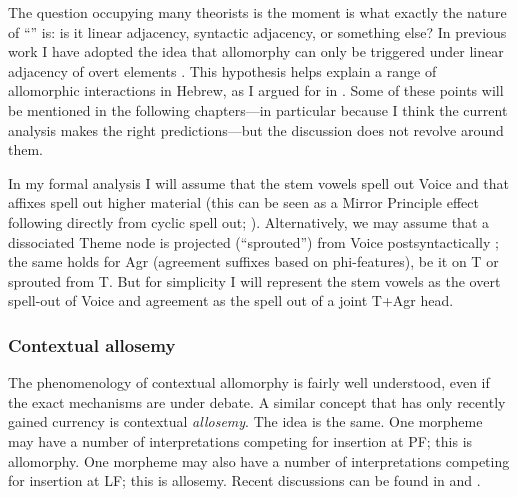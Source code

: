 \begin{exe}
\begin{xlist}
\begin{exe}
\begin{exe}
\begin{exe}
\begin{exe}
\begin{xlist}
\begin{exe}
\begin{xlist}
\begin{xlist}
\begin{xlist}
\begin{exe}
\begin{xlist}
\begin{exe}
\begin{exe}
\begin{exe}
\begin{exe}
\begin{xlist}
\begin{exe}
\begin{xlist}
\begin{exe}
\begin{exe}
\begin{xlist}
\begin{exe}
\begin{xlist}
\begin{exe}
\begin{xlist}
\begin{exe}
\begin{exe}
\begin{xlist}
\begin{exe}
\begin{exe}
\begin{xlist}
\begin{exe}
\begin{exe}
\begin{xlist}
\begin{exe}
The question occupying many theorists is the moment is what exactly the nature of ``\trace'' is: is it linear adjacency, syntactic adjacency, or something else? In previous work I have adopted the idea that allomorphy can only be triggered under linear adjacency of overt elements \citep{embick10,marantz13}. This hypothesis helps explain a range of allomorphic interactions in Hebrew, as I argued for in \cite{kastner18nllt}. Some of these points will be mentioned in the following chapters---in particular because I think the current analysis makes the right predictions---but the discussion does not revolve around them.

In my formal analysis I will assume that the stem vowels spell out Voice and that affixes spell out higher material (this can be seen as a Mirror Principle effect following directly from cyclic spell out; \citealt{baker85,muysken88,katie13,zukoff16nels,kastner18nllt}). Alternatively, we may assume that a dissociated Theme node is projected (``sprouted'') from Voice postsyntactically \citep{oltramassuet99,embick10}; the same holds for Agr (agreement suffixes based on phi-features), be it on T or sprouted from T. But for simplicity I will represent the stem vowels as the overt spell-out of Voice and agreement as the spell out of a joint T+Agr head.

		\subsubsection{Contextual allosemy}
The phenomenology of contextual allomorphy is fairly well understood, even if the exact mechanisms are under debate. A similar concept that has only recently gained currency is contextual \emph{allosemy}. The idea is the same. One morpheme may have a number of interpretations competing for insertion at PF; this is allomorphy. One morpheme may also have a number of interpretations competing for insertion at LF; this is allosemy. Recent discussions can be found in \cite{woodmarantz17} and \cite{mylermarantz19cup}.


\end{exe}
\end{xlist}
\end{exe}
\end{exe}
\end{xlist}
\end{exe}
\end{exe}
\end{xlist}
\end{exe}
\end{exe}
\end{xlist}
\end{exe}
\end{xlist}
\end{exe}
\end{xlist}
\end{exe}
\end{exe}
\end{xlist}
\end{exe}
\end{xlist}
\end{exe}
\end{exe}
\end{exe}
\end{exe}
\end{xlist}
\end{exe}
\end{xlist}
\end{xlist}
\end{xlist}
\end{exe}
\end{xlist}
\end{exe}
\end{exe}
\end{exe}
\end{exe}
\end{xlist}
\end{exe}
